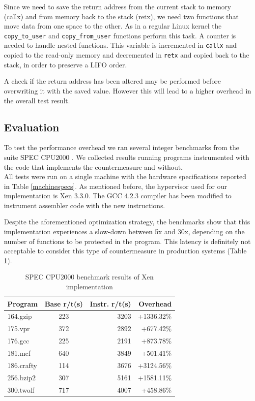 Since we need to save the return address from the current stack to memory (callx) and from memory back to the stack (retx), we need two functions that move data from one space to the other. As in a regular Linux kernel the \texttt{copy\_to\_user} and \texttt{copy\_from\_user} functions perform this task. A counter is needed to handle nested functions. This variable is incremented in \texttt{callx} and copied to the read-only memory and decremented in \texttt{retx} and copied back to the stack, in order to preserve a LIFO order.

A check if the return address has been altered may be performed before overwriting it with the saved value. However this will lead to a higher overhead in the overall test result. 

\subsection{Evaluation}\label{ins:evaluation}
To test the performance overhead we ran several integer benchmarks from the suite SPEC CPU2000 \cite{spec2000}. We collected results running programs instrumented with the code that implements the countermeasure and without.\\
All tests were run on a single machine with the hardware specifications reported in Table \ref{machinespecs}. 
As mentioned before, the hypervisor used for our implementation is Xen 3.3.0. The GCC 4.2.3 compiler has been modified to instrument assembler code with the new instructions.

Despite the aforementioned optimization strategy, the benchmarks show that this implementation experiences a slow-down between 5x and 30x, depending on the number of functions to be protected in the program. This latency is definitely not acceptable to consider this type of countermeasure in production systems (Table \ref{table:xenres}).


\begin{table} \label{table:xenres}
 \begin{tabular}{ |l | c | r | r |}
    \hline
\textbf{Program} & \textbf{Base r/t(s)}& \textbf{Instr. r/t(s)}& \textbf{Overhead} \\ \hline
 164.gzip & 223 & 3203 & +1336.32\%  \\ \hline
 175.vpr  & 372 &  2892 &  +677.42\% \\ \hline
   176.gcc  & 225 & 2191 &    +873.78\%  \\ \hline
   181.mcf    &640   & 3849 &    +501.41\%  \\ \hline
   186.crafty    &114& 3676&   +3124.56\%  \\ \hline
   256.bzip2   &307 & 5161 &   +1581.11\%  \\ \hline
   300.twolf    &717 & 4007&   +458.86\%  \\
     \hline
  \end{tabular}
  \caption{SPEC CPU2000 benchmark results of Xen implementation}
\end{table}



